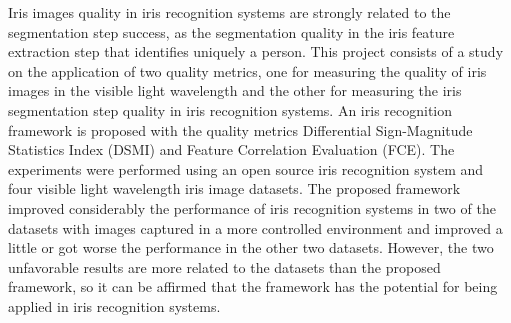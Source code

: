 Iris images quality in iris recognition systems are strongly related to the segmentation step success, as the segmentation quality in the iris feature extraction step that identifies uniquely a person. This project consists of a study on the application of two quality metrics, one for measuring the quality of iris images in the visible light wavelength and the other for measuring the iris segmentation step quality in iris recognition systems. An iris recognition framework is proposed with the quality metrics Differential Sign-Magnitude Statistics Index (DSMI) and Feature Correlation Evaluation (FCE). The experiments were performed using an open source iris recognition system and four visible light wavelength iris image datasets. The proposed framework improved considerably the performance of iris recognition systems in two of the datasets with images captured in a more controlled environment and improved a little or got worse the performance in the other two datasets. However, the two unfavorable results are more related to the datasets than the proposed framework, so it can be affirmed that the framework has the potential for being applied in iris recognition systems.